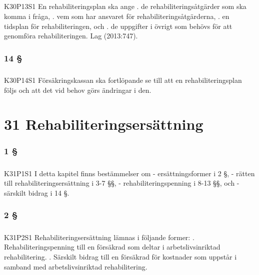 \documentclass[a4paper,notitlepage,openany,10pt]{book}
\begin{document}
\paragraph*{}
{\tiny K30P13S1}
En rehabiliteringsplan ska ange
. de rehabiliteringsåtgärder som ska komma i fråga,
. vem som har ansvaret för rehabiliteringsåtgärderna,
. en tidsplan för rehabiliteringen, och
. de uppgifter i övrigt som behövs för att genomföra rehabiliteringen.
Lag (2013:747).
\subsection*{14 §}
\paragraph*{}
{\tiny K30P14S1}
Försäkringskassan ska fortlöpande se till att en rehabiliteringsplan följs och att det vid behov görs ändringar i den.
\chapter*{31 Rehabiliteringsersättning}
\subsection*{1 §}
\paragraph*{}
{\tiny K31P1S1}
I detta kapitel finns bestämmelser om
\newline - ersättningsformer i 2 §,
\newline - rätten till rehabiliteringsersättning i 3-7 §§,
\newline - rehabiliteringspenning i 8-13 §§, och
\newline - särskilt bidrag i 14 §.
\subsection*{2 §}
\paragraph*{}
{\tiny K31P2S1}
Rehabiliteringsersättning lämnas i följande former:
. Rehabiliteringspenning till en försäkrad som deltar i arbetslivsinriktad rehabilitering.
. Särskilt bidrag till en försäkrad för kostnader som uppstår i samband med arbetslivsinriktad rehabilitering.
\end{document}
